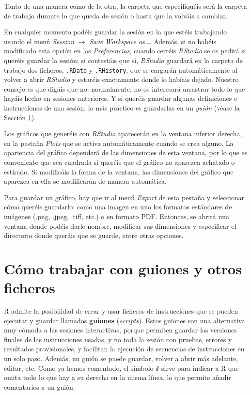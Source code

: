 \documentclass[
]{book}
\theoremstyle{definition}
\theoremstyle{definition}
\theoremstyle{definition}
\theoremstyle{remark}
\begin{document}
Tanto de una manera como de la otra, la carpeta que especifiquéis será la carpeta de trabajo durante lo que queda de sesión o hasta que la volváis a cambiar.

En cualquier momento podéis guardar la sesión en la que estéis trabajando usando el menú \emph{Session} \(\rightarrow\) \emph{Save Workspace as\ldots{}}.
Además, si no habéis modificado esta opción en las \emph{Preferencias}, cuando cerréis \emph{RStudio} se os pedirá si queréis guardar la sesión; si contestáis que sí, \emph{RStudio} guardará en la carpeta de trabajo dos ficheros, \texttt{.RData} y \texttt{.RHistory}, que se cargarán automáticamente al volver a abrir \emph{RStudio} y estaréis exactamente donde lo habíais dejado. Nuestro consejo es que digáis que no: normalmente, no os interesará arrastrar todo lo que hayáis hecho en sesiones anteriores. Y si queréis guardar algunas definiciones e instrucciones de una sesión, lo más práctico es guardarlas en un \emph{guión} (véase la Sección \ref{sec:guiones}).

Los gráficos que generéis con \emph{RStudio} aparecerán en la ventana inferior derecha, en la pestaña \emph{Plots} que se activa automáticamente cuando se crea alguno. La apariencia del gráfico dependerá de las dimensiones de esta ventana, por lo que es conveniente que sea cuadrada si queréis que el gráfico no aparezca achatado o estirado. Si modificáis la forma de la ventana, las dimensiones del gráfico que aparezca en ella se modificarán de manera automática.

Para guardar un gráfico, hay que ir al menú \emph{Export} de esta pestaña y seleccionar cómo queréis guardarlo: como una imagen en uno los formatos estándares de imágenes (.png, .jpeg, .tiff, etc.) o en formato PDF. Entonces, se abrirá una ventana donde podéis darle nombre, modificar sus dimensiones y especificar el directorio donde queráis que se guarde, entre otras opciones.

\hypertarget{sec:guiones}{%
\section{Cómo trabajar con guiones y otros ficheros}\label{sec:guiones}}

R admite la posibilidad de crear y usar ficheros de instrucciones que se pueden ejecutar y guardar llamados \textbf{guiones} (\emph{scripts}). Estos guiones son una alternativa muy cómoda a las sesiones interactivas, porque permiten guardar las versiones finales de las instrucciones usadas, y no toda la sesión con pruebas, errores y resultados provisionales, y facilitan la ejecución de secuencias de instrucciones en un solo paso. Además, un guión se puede guardar, volver a abrir más adelante, editar, etc. Como ya hemos comentado, el símbolo \texttt{\#} sirve para indicar a R que omita todo lo que hay a su derecha en la misma línea, lo que permite añadir comentarios a un guión.
\end{document}
